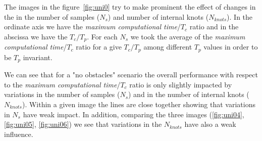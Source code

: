 The images in the figure~\ref{fig:uni0} try to make prominent the effect of changes in the in the number of samples ($N_s$) and number of internal knots ($N_{knots}$). In the ordinate axis we have the \textit{maximum computational time}/$T_c$ ratio and in the abscissa we have the $T_c/T_p$. For each $N_s$ we took the average of the \textit{maximum computational time}/$T_c$ ratio for a give $T_c/T_p$ among different $T_p$ values in order to be $T_p$ invariant.

We can see that for a "no obstacles" scenario the overall performance with respect to the \textit{maximum computational time}/$T_c$ ratio is only slightly impacted by variations in the number of samples ($N_s$) and in the number of internal knots ($N_{knots}$). Within a given image the lines are close together showing that variations in $N_s$ have weak impact. In addition, comparing the three images (\ref{fig:uni04}, \ref{fig:uni05}, \ref{fig:uni06}) we see that variations in the $N_{knots}$ have also a weak influence.

